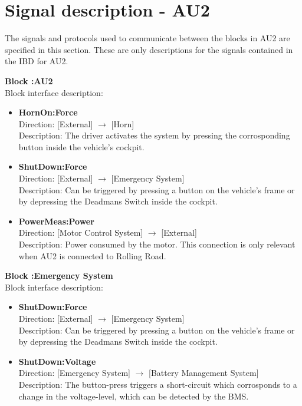 \section{Signal description - AU2}
The signals and protocols used to communicate between the blocks in AU2 are specified in this section. These are only descriptions for the signals contained in the IBD for AU2.

\textbf{Block :AU2}\\
Block interface description:
\begin{itemize}
	\item \textbf{HornOn:Force}\\
	Direction: [External] $\rightarrow$ [Horn]\\
	Description: The driver activates the system by pressing the corrosponding button inside the vehicle's cockpit.
	\item \textbf{ShutDown:Force}\\
	Direction: [External] $\rightarrow$ [Emergency System]\\
	Description: Can be triggered by pressing a button on the vehicle's frame or by depressing the Deadmans Switch inside the cockpit.
	\item \textbf{PowerMeas:Power}\\
	Direction: [Motor Control System] $\rightarrow$ [External]\\
	Description: Power consumed by the motor. This connection is only relevant when AU2 is connected to Rolling Road.
\end{itemize}

\textbf{Block :Emergency System}\\
Block interface description:
\begin{itemize}
	\item \textbf{ShutDown:Force}\\
	Direction: [External] $\rightarrow$ [Emergency System]\\
	Description: Can be triggered by pressing a button on the vehicle's frame or by depressing the Deadmans Switch inside the cockpit.
	\item \textbf{ShutDown:Voltage}\\
	Direction: [Emergency System] $\rightarrow$ [Battery Management System]\\
	Description: The button-press triggers a short-circuit which corrosponds to a change in the voltage-level, which can be detected by the BMS.
\end{itemize}

